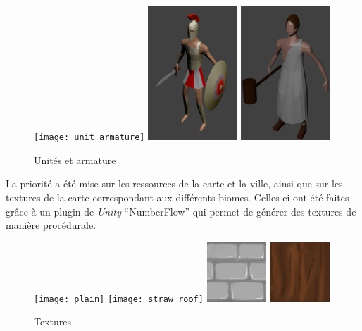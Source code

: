 \documentclass[12pt]{report}
\begin{document}
\begin{figure}[H]
    \centering
    \texttt{[image: unit\_armature]}
    \includegraphics[width=0.3\textwidth]{swordmen}
    \includegraphics[width=0.3\textwidth]{worker}
    \caption{Unités et armature}
\end{figure}

La priorité a été mise sur les ressources de la carte et la ville, ainsi que sur les textures de la carte correspondant aux différents biomes. Celles-ci ont été faites grâce à un plugin de \textit{Unity} “NumberFlow” qui permet de générer des textures de manière procédurale.

\begin{figure}[H]
    \centering
    \texttt{[image: plain]}
    \texttt{[image: straw\_roof]}
    \includegraphics[width=0.2\textwidth]{wall}
    \includegraphics[width=0.2\textwidth]{wood}
    \caption{Textures}
\end{figure}
\end{document}
